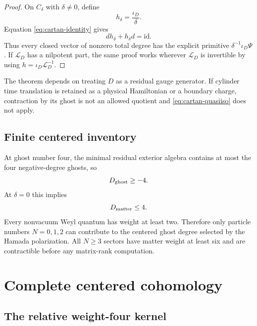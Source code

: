 \documentclass[11pt]{article}
\theoremstyle{definition}
\theoremstyle{remark}
\newcommand{\cL}{\mathcal L}
\newcommand{\id}{\mathrm{id}}
\begin{document}
\begin{proof}
On $C_\delta$ with $\delta\ne0$, define
\begin{equation}
 h_\delta=\frac{\iota_D}{\delta}.
\end{equation}
Equation \eqref{eq:cartan-identity} gives
\begin{equation}
 dh_\delta+h_\delta d=\id.
\end{equation}
Thus every closed vector of nonzero total degree has the explicit primitive
$\delta^{-1}\iota_D\Psi$.  If $\cL_D$ has a nilpotent part, the same proof
works wherever $\cL_D$ is invertible by using
$h=\iota_D\cL_D^{-1}$.
\end{proof}

The theorem depends on treating $D$ as a residual gauge generator.  If
cylinder time translation is retained as a physical Hamiltonian or a
boundary charge, contraction by its ghost is not an allowed quotient and
\eqref{eq:cartan-quasiiso} does not apply.

\subsection{Finite centered inventory}

At ghost number four, the minimal residual exterior algebra contains at
most the four negative-degree ghosts, so
\begin{equation}
 D_{\rm ghost}\ge-4.
\end{equation}
At $\delta=0$ this implies
\begin{equation}\label{eq:matter-bound}
 D_{\rm matter}\le4.
\end{equation}
Every nonvacuum Weyl quantum has weight at least two.  Therefore only
particle numbers $N=0,1,2$ can contribute to the centered ghost degree
selected by the Hamada polarization.  All $N\ge3$ sectors have matter weight at least six and are
contractible before any matrix-rank computation.

\section{Complete centered cohomology}\label{sec:centered}

\subsection{The relative weight-four kernel}
\end{document}
